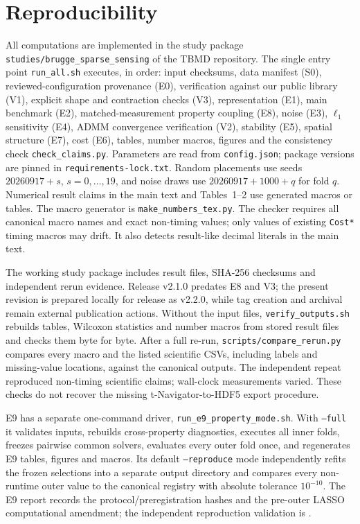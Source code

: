 \section{Reproducibility}
\label{sec:S_repro}
All computations are implemented in the study package \texttt{studies/brugge\_sparse\_sensing} of the TBMD repository. The single entry point \texttt{run\_all.sh} executes, in order: input checksums, data manifest (S0), reviewed-configuration provenance (E0), verification against our public library (V1), explicit shape and contraction checks (V3), representation (E1), main benchmark (E2), matched-measurement property coupling (E8), noise (E3), $\ell_1$ sensitivity (E4), ADMM convergence verification (V2), stability (E5), spatial structure (E7), cost (E6), tables, number macros, figures and the consistency check \texttt{check\_claims.py}. Parameters are read from \texttt{config.json}; package versions are pinned in \texttt{requirements-lock.txt}. Random placements use seeds $20260917+s$, $s=0,\dots,19$, and noise draws use $20260917+1000+q$ for fold $q$. Numerical result claims in the main text and Tables~1--2 use generated macros or tables. The macro generator is \texttt{make\_numbers\_tex.py}. The checker requires all canonical macro names and exact non-timing values; only values of existing \texttt{Cost*} timing macros may drift. It also detects result-like decimal literals in the main text.

The working study package includes result files, SHA-256 checksums and independent rerun evidence. Release v2.1.0 predates E8 and V3; the present revision is prepared locally for release as v2.2.0, while tag creation and archival remain external publication actions. Without the input files, \texttt{verify\_outputs.sh} rebuilds tables, Wilcoxon statistics and number macros from stored result files and checks them byte for byte. After a full re-run, \texttt{scripts/compare\_rerun.py} compares every macro and the listed scientific CSVs, including labels and missing-value locations, against the canonical outputs. The independent repeat reproduced non-timing scientific claims; wall-clock measurements varied. These checks do not recover the missing t-Navigator-to-HDF5 export procedure.

E9 has a separate one-command driver, \texttt{run\_e9\_property\_mode.sh}. With \texttt{--full} it validates inputs, rebuilds cross-property diagnostics, executes all inner folds, freezes pairwise common solvers, evaluates every outer fold once, and regenerates E9 tables, figures and macros. Its default \texttt{--reproduce} mode independently refits the frozen selections into a separate output directory and compares every non-runtime outer value to the canonical registry with absolute tolerance $10^{-10}$. The E9 report records the protocol/preregistration hashes and the pre-outer LASSO computational amendment; the independent reproduction validation is .
